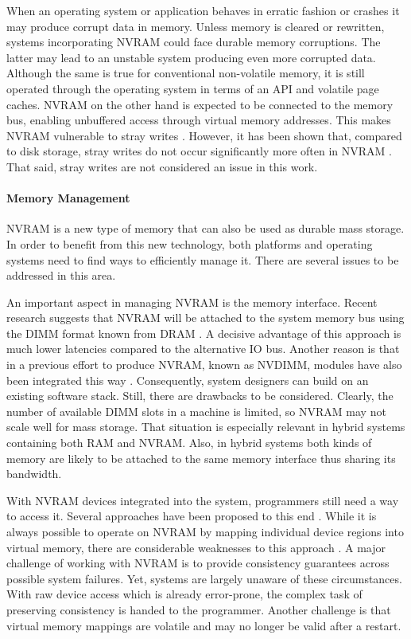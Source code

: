 When an operating system or application behaves in erratic fashion or crashes it
may produce corrupt data in memory. Unless memory is cleared or rewritten,
systems incorporating NVRAM could face durable memory corruptions. The latter
may lead to an unstable system producing even more corrupted data. Although the
same is true for conventional non-volatile memory, it is still operated through
the operating system in terms of an API and volatile page caches. NVRAM on the
other hand is expected to be connected to the memory bus, enabling unbuffered
access through virtual memory addresses. This makes NVRAM vulnerable to stray
writes \cite{condit2009better, venkataraman2011consistent}. However, it has been
shown that, compared to disk storage, stray writes do not occur significantly
more often in NVRAM \cite{chen1996rio}. That said, stray writes are not considered an issue in this work.

\paragraph{Memory Management}

NVRAM is a new type of memory that can also be used as durable mass storage. In
order to benefit from this new technology, both platforms and operating systems
need to find ways to efficiently manage it. There are several issues to be
addressed in this area.


An important aspect in managing NVRAM is the memory interface. Recent research
suggests that NVRAM will be attached to the system memory bus using the DIMM
format known from DRAM \cite{volos2017whisper, oukid2017data, andrei2017sap,
intel2017nvdimm}. A decisive advantage of this approach is much lower latencies
compared to the alternative IO bus. Another reason is that in a previous effort
to produce NVRAM, known as NVDIMM, modules have also been integrated this way
\cite{dulloor2014system, huang2014design}. Consequently, system designers can
build on an existing software stack. Still, there are drawbacks to be
considered. Clearly, the number of available DIMM slots in a machine is limited,
so NVRAM may not scale well for mass storage. That situation is especially
relevant in hybrid systems containing both RAM and NVRAM. Also, in hybrid
systems both kinds of memory are likely to be attached to the same memory
interface thus sharing its bandwidth.

With NVRAM devices integrated into the system, programmers still need a way to
access it. Several approaches have been proposed to this end
\cite{volos2017whisper}. While it is always possible to operate on NVRAM by
mapping individual device regions into virtual memory, there are considerable
weaknesses to this approach \cite{condit2009better, volos2011mnemosyne,
dulloor2014system, volos2017whisper}. A major challenge of working with NVRAM is
to provide consistency guarantees across possible system failures. Yet, systems
are largely unaware of these circumstances. With raw device access which is
already error-prone, the complex task of preserving consistency is handed to the
programmer. Another challenge is that virtual memory mappings are volatile and
may no longer be valid after a restart.

